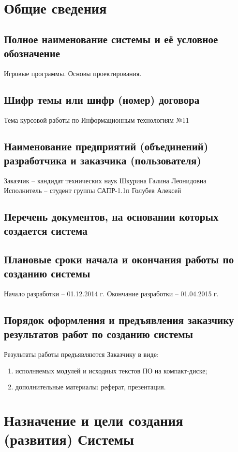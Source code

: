 \chapter{Общие сведения}
\section{Полное наименование системы и её условное обозначение}
Игровые программы. Основы проектирования.

\section{Шифр темы или шифр (номер) договора}
Тема курсовой работы по Информационным технологиям №11

\section{Наименование предприятий (объединений) разработчика и заказчика (пользователя)}
Заказчик -- кандидат технических наук Шкурина Галина Леонидовна\\
Исполнитель -- студент группы САПР-1.1п Голубев Алексей

\section{Перечень документов, на основании которых создается система}
\section{Плановые сроки начала и окончания работы по созданию системы}
Начало разработки -- 01.12.2014 г. Окончание разработки -- 01.04.2015 г.

\section{Порядок оформления и предъявления заказчику результатов работ по созданию системы}
Результаты работы предъявляются Заказчику в виде:
\begin{enumerate}
    \item исполняемых модулей и исходных текстов ПО на компакт-диске;
    \item дополнительные материалы: реферат, презентация.
\end{enumerate}

\chapter{Назначение и цели создания (развития) Системы}
